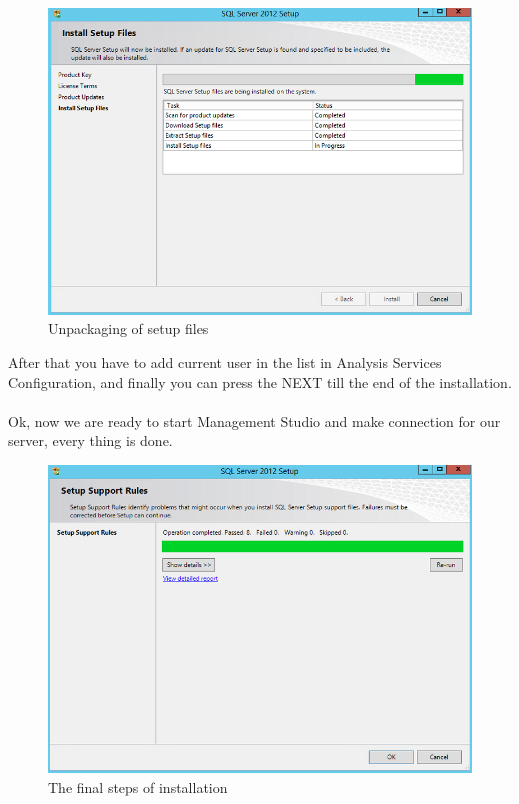 \documentclass[english]{article}
\begin{document}
\begin{figure}[hb]
\centerline{\includegraphics[scale=0.45]{SQL/installing}}
\caption{Unpackaging of setup files}
\end{figure}
After that you have to add current user in the list in Analysis Services Configuration, and finally you can press the NEXT till the end of the installation.\\\\
Ok, now we are ready to start Management Studio and make connection for our server, every thing is done.
\begin{figure}[H]
\centerline{\includegraphics[scale=0.45]{SQL/installetionProcces}}
\caption{The final steps of installation}
\end{figure}
\end{document}
